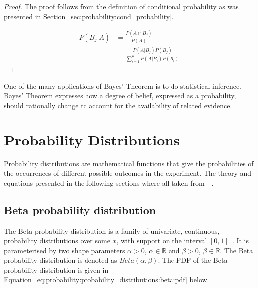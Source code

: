 \begin{proof}
      The proof follows from the definition of conditional probability as was presented in Section~\ref{sec:probability:cond_probability}.

      \begin{equation}
            \begin{split}
                  P(B_{j} \vert A)
                  &= \frac{P(A \cap B_{j})}{P(A)}\\
                  &= \frac{P(A \vert B_{j})P(B_{j})}{\sum_{i=1}^{K} P(A \vert B_{i})P(B_{i})}
            \end{split}
      \end{equation}
\end{proof}

One of the many applications of Bayes' Theorem is to do statistical inference. Bayes' Theorem expresses how a degree of belief, expressed as a probability, should rationally change to account for the availability of related evidence.


\section{Probability Distributions}\label{sec:probability:probability_distributions}

Probability distributions are mathematical functions that give the probabilities of the occurrences of different possible outcomes in the experiment. The theory and equations presented in the following sections where all taken from~\citeauthor{ref:wackerly:2014}~\cite{ref:wackerly:2014}.


\subsection{Beta probability distribution}\label{sec:probability:probability_distributions:beta}

The Beta probability distribution is a family of univariate, continuous, probability distributions over some $x$, with support on the interval $[0,1]$~\cite{ref:wackerly:2014}. It is parameterised by two shape parameters $\alpha > 0$, $\alpha \in \mathbb{R}$ and $\beta > 0$, $\beta \in \mathbb{R}$. The Beta probability distribution is denoted as $Beta(\alpha, \beta)$. The \acf{PDF} of the Beta probability distribution is given in Equation~\eqref{eq:probability:probability_distributions:beta:pdf} below.


